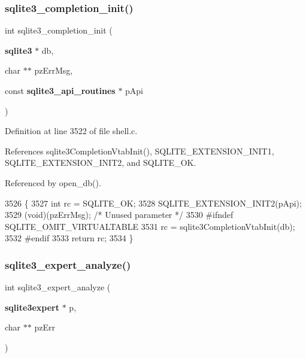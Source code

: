 \subsubsection{sqlite3\+\_\+completion\+\_\+init()}
{\footnotesize\ttfamily int sqlite3\+\_\+completion\+\_\+init (\begin{DoxyParamCaption}\item[{\textbf{ sqlite3} $\ast$}]{db,  }\item[{char $\ast$$\ast$}]{pz\+Err\+Msg,  }\item[{const \textbf{ sqlite3\+\_\+api\+\_\+routines} $\ast$}]{p\+Api }\end{DoxyParamCaption})}



Definition at line 3522 of file shell.\+c.



References sqlite3\+Completion\+Vtab\+Init(), S\+Q\+L\+I\+T\+E\+\_\+\+E\+X\+T\+E\+N\+S\+I\+O\+N\+\_\+\+I\+N\+I\+T1, S\+Q\+L\+I\+T\+E\+\_\+\+E\+X\+T\+E\+N\+S\+I\+O\+N\+\_\+\+I\+N\+I\+T2, and S\+Q\+L\+I\+T\+E\+\_\+\+OK.



Referenced by open\+\_\+db().


\begin{DoxyCode}
3526  \{
3527   \textcolor{keywordtype}{int} rc = SQLITE_OK;
3528   SQLITE_EXTENSION_INIT2(pApi);
3529   (void)(pzErrMsg);  \textcolor{comment}{/* Unused parameter */}
3530 \textcolor{preprocessor}{#ifndef SQLITE\_OMIT\_VIRTUALTABLE}
3531   rc = sqlite3CompletionVtabInit(db);
3532 \textcolor{preprocessor}{#endif}
3533   \textcolor{keywordflow}{return} rc;
3534 \}
\end{DoxyCode}
\mbox{\label{shell_8c_a515a70fba5c3ad73b282d31942eb7aff}} 
\subsubsection{sqlite3\+\_\+expert\+\_\+analyze()}
{\footnotesize\ttfamily int sqlite3\+\_\+expert\+\_\+analyze (\begin{DoxyParamCaption}\item[{\textbf{ sqlite3expert} $\ast$}]{p,  }\item[{char $\ast$$\ast$}]{pz\+Err }\end{DoxyParamCaption})}



